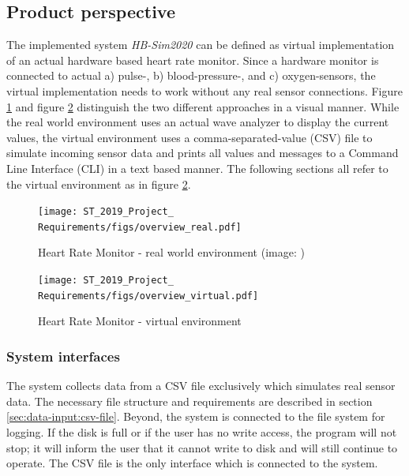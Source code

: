 \documentclass[a4paper]{article}
\begin{document}
\subsection{Product perspective}

The implemented system \textit{HB-Sim2020} can be defined as virtual implementation of an actual hardware based heart rate monitor. Since a hardware monitor is connected to actual a) pulse-, b) blood-pressure-, and c) oxygen-sensors, the virtual implementation needs to work without any real sensor connections. Figure \ref{fig:overview-real} and figure \ref{fig:overview-virtual} distinguish the two different approaches in a visual manner. While the real world environment uses an actual wave analyzer to display the current values, the virtual environment uses a comma-separated-value (CSV) file to simulate incoming sensor data and prints all values and messages to a Command Line Interface (CLI) in a text based manner. The following sections all refer to the virtual environment as in figure \ref{fig:overview-virtual}.


\begin{figure}[H]
\centering
    \texttt{[image: ST\_2019\_Project\_ Requirements/figs/overview\_real.pdf]}
    \caption{Heart Rate Monitor - real world environment (image: \cite{b1})}
    \label{fig:overview-real}
\end{figure}

\begin{figure}[H]
\centering
    \texttt{[image: ST\_2019\_Project\_ Requirements/figs/overview\_virtual.pdf]}
    \caption{Heart Rate Monitor - virtual environment}
    \label{fig:overview-virtual}
\end{figure}

\subsubsection{System interfaces}
The system collects data from a CSV file exclusively which simulates real sensor data. The necessary file structure and requirements are described in section \ref{sec:data-input:csv-file}. Beyond, the system is connected to the file system for logging. If the disk is full or if the user has no write access, the program will not stop; it will inform the user that it cannot write to disk and will still continue to operate. The CSV file is the only interface which is connected to the system.
\end{document}

